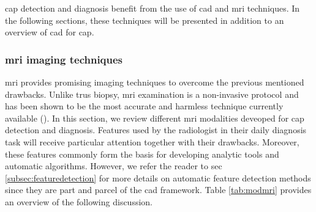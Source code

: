 \ac{cap} detection and diagnosis benefit from the use of \acs{cad} and \ac{mri} techniques. In the following sections, these techniques will be presented in addition to an overview of \acs{cad} for \ac{cap}.

\subsubsection{\ac{mri} imaging techniques}\label{subsubsec:mrimrsi}

\ac{mri} provides promising imaging techniques to overcome the previous mentioned drawbacks. Unlike \ac{trus} biopsy, \ac{mri} examination is a non-invasive protocol and has been shown to be the most accurate and harmless technique currently available (\cite{Turkbey2012}). In this section, we review different \ac{mri} modalities deveoped for \ac{cap} detection and diagnosis. Features used by the radiologist in their daily diagnosis task will receive particular attention together with their drawbacks. Moreover, these features commonly form the basis for developing analytic tools and automatic algorithms. However, we refer the reader to \acs{sec} \ref{subsec:featuredetection} for more details on automatic feature detection methods since they are part and parcel of the \acs{cad} framework. Table \ref{tab:modmri} provides an overview of the following discussion.


